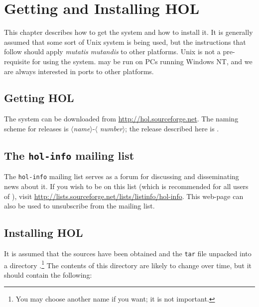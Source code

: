 \chapter{Getting and Installing HOL}
\label{install}

This chapter describes how to get the \HOL{} system and how to install
it.  It is generally assumed that some sort of Unix system is being
used, but the instructions that follow should apply {\it mutatis
  mutandis\/} to other platforms.  Unix is not a pre-requisite for
using the system. \HOL{} may be run on PCs running Windows NT, and we
are always interested in ports to other platforms.

\section{Getting HOL}

The \HOL{} system can be downloaded from
\url{http://hol.sourceforge.net}.  The naming scheme for \holn{}
releases is $\langle${\it name}$\rangle$-$\langle${\it
  number}$\rangle$; the release described here is \holnversion.

\section{The {\tt hol-info} mailing list}

The \texttt{hol-info} mailing list serves as a forum for discussing
\HOL{} and disseminating news about it.  If you wish to be on this
list (which is recommended for all users of \HOL), visit
\url{http://lists.sourceforge.net/lists/listinfo/hol-info}.  This
web-page can also be used to unsubscribe from the mailing list.

\section{Installing HOL}

It is assumed that the \HOL{} sources have been obtained and the
\texttt{tar} file unpacked into a directory .\footnote{You may
  choose another name if you want; it is not important.} The contents
of this directory are likely to change over time, but it should
contain the following:


